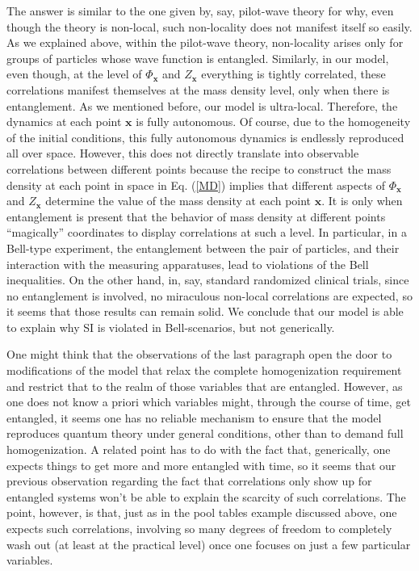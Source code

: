 \documentclass[letterpaper,12pt]{article}
\begin{document}
The answer is similar to the one given by, say, pilot-wave theory for why, even though the theory is non-local, such non-locality does not manifest itself so easily. As we explained above, within the pilot-wave theory, non-locality arises only for groups of particles whose wave function is entangled. Similarly, in our model, even though, at the level of $\Phi_\mathbf{x} $ and $Z_\mathbf{x}$ everything is tightly correlated, these correlations manifest themselves at the mass density level, only when there is entanglement. As we mentioned before, our model is ultra-local. Therefore, the dynamics at each point $\mathbf{x} $ is fully autonomous. Of course, due to the homogeneity of the initial conditions, this fully autonomous dynamics is endlessly reproduced all over space. However, this does not directly translate into observable correlations between different points because the recipe to construct the mass density at each point in space in Eq. (\ref{MD}) implies that different aspects of $\Phi_\mathbf{x} $ and $Z_\mathbf{x}$ determine the value of the mass density at each point $\mathbf{x}$. It is only when entanglement is present that the behavior of mass density at different points ``magically'' coordinates to display correlations at such a level. In particular, in a Bell-type experiment, the entanglement between the pair of particles, and their interaction with the measuring apparatuses, lead to violations of the Bell inequalities. On the other hand, in, say, standard randomized clinical trials, since no entanglement is involved, no miraculous non-local correlations are expected, so it seems that those results can remain solid. We conclude that our model is able to explain why SI is violated in Bell-scenarios, but not generically. 
 
One might think that the observations of the last paragraph open the door to modifications of the model that relax the complete homogenization requirement and restrict that to the realm of those variables that are entangled. However, as one does not know a priori which variables might, through the course of time, get entangled, it seems one has no reliable mechanism to ensure that the model reproduces quantum theory under general conditions, other than to demand full homogenization. A related point has to do with the fact that, generically, one expects things to get more and more entangled with time, so it seems that our previous observation regarding the fact that correlations only show up for entangled systems won't be able to explain the scarcity of such correlations. The point, however, is that, just as in the pool tables example discussed above, one expects such correlations, involving so many degrees of freedom to completely wash out (at least at the practical level) once one focuses on just a few particular variables.
 
\end{document}
